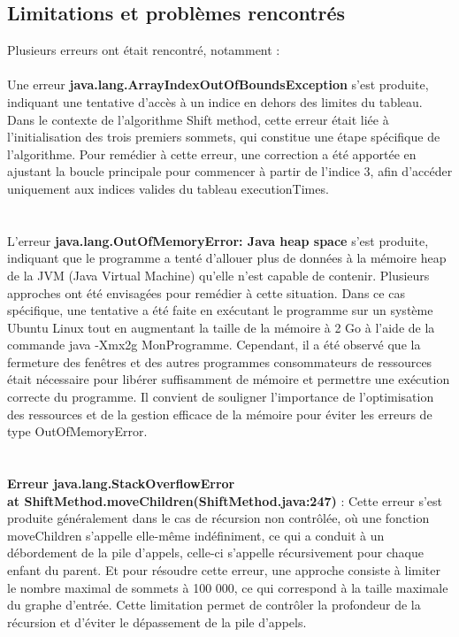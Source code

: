\documentclass[hidelinks,letterpaper,12pt]{article}
\begin{document}

\subsection{Limitations et problèmes rencontrés} 
Plusieurs erreurs ont était rencontré, notamment :
\\ \\
Une erreur \textbf{java.lang.ArrayIndexOutOfBoundsException} s'est produite, indiquant une tentative d'accès à un indice en dehors des limites du tableau. Dans le contexte de l'algorithme Shift method, cette erreur était liée à l'initialisation des trois premiers sommets, qui constitue une étape spécifique de l'algorithme. Pour remédier à cette erreur, une correction a été apportée en ajustant la boucle principale pour commencer à partir de l'indice 3, afin d'accéder uniquement aux indices valides du tableau executionTimes.
\\ \\ \\
L'erreur \textbf{java.lang.OutOfMemoryError: Java heap space} s'est produite, indiquant que le programme a tenté d'allouer plus de données à la mémoire heap de la JVM (Java Virtual Machine) qu'elle n'est capable de contenir. Plusieurs approches ont été envisagées pour remédier à cette situation. Dans ce cas spécifique, une tentative a été faite en exécutant le programme sur un système Ubuntu Linux tout en augmentant la taille de la mémoire à 2 Go à l'aide de la commande java -Xmx2g MonProgramme. Cependant, il a été observé que la fermeture des fenêtres et des autres programmes consommateurs de ressources était nécessaire pour libérer suffisamment de mémoire et permettre une exécution correcte du programme. Il convient de souligner l'importance de l'optimisation des ressources et de la gestion efficace de la mémoire pour éviter les erreurs de type OutOfMemoryError.
\\ \\ \\
\textbf{Erreur java.lang.StackOverflowError 
\\
at ShiftMethod.moveChildren(ShiftMethod.java:247)} : Cette erreur s'est produite généralement dans le cas de récursion non contrôlée, où une fonction moveChildren s'appelle elle-même indéfiniment, ce qui a conduit à un débordement de la pile d'appels, celle-ci s'appelle récursivement pour chaque enfant du parent. Et pour résoudre cette erreur, une approche consiste à limiter le nombre maximal de sommets à 100 000, ce qui correspond à la taille maximale du graphe d'entrée. Cette limitation permet de contrôler la profondeur de la récursion et d'éviter le dépassement de la pile d'appels.
\end{document}
